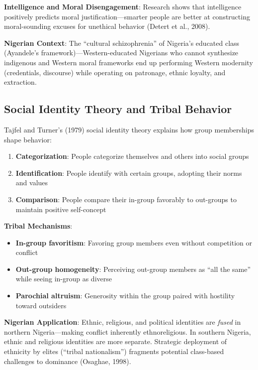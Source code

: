 \documentclass[11pt,a4paper]{article}
\begin{document}
\textbf{Intelligence and Moral Disengagement}: Research shows that intelligence positively predicts moral justification—smarter people are better at constructing moral-sounding excuses for unethical behavior (Detert et al., 2008).

\textbf{Nigerian Context}: The ``cultural schizophrenia'' of Nigeria's educated class (Ayandele's framework)—Western-educated Nigerians who cannot synthesize indigenous and Western moral frameworks end up performing Western modernity (credentials, discourse) while operating on patronage, ethnic loyalty, and extraction.

\subsection{Social Identity Theory and Tribal Behavior}

Tajfel and Turner's (1979) social identity theory explains how group memberships shape behavior:

\begin{enumerate}[leftmargin=*]
    \item \textbf{Categorization}: People categorize themselves and others into social groups
    \item \textbf{Identification}: People identify with certain groups, adopting their norms and values
    \item \textbf{Comparison}: People compare their in-group favorably to out-groups to maintain positive self-concept
\end{enumerate}

\textbf{Tribal Mechanisms}:
\begin{itemize}[leftmargin=*]
    \item \textbf{In-group favoritism}: Favoring group members even without competition or conflict
    \item \textbf{Out-group homogeneity}: Perceiving out-group members as ``all the same'' while seeing in-group as diverse
    \item \textbf{Parochial altruism}: Generosity within the group paired with hostility toward outsiders
\end{itemize}

\textbf{Nigerian Application}: Ethnic, religious, and political identities are \textit{fused} in northern Nigeria—making conflict inherently ethnoreligious. In southern Nigeria, ethnic and religious identities are more separate. Strategic deployment of ethnicity by elites (``tribal nationalism'') fragments potential class-based challenges to dominance (Osaghae, 1998).
\end{document}
